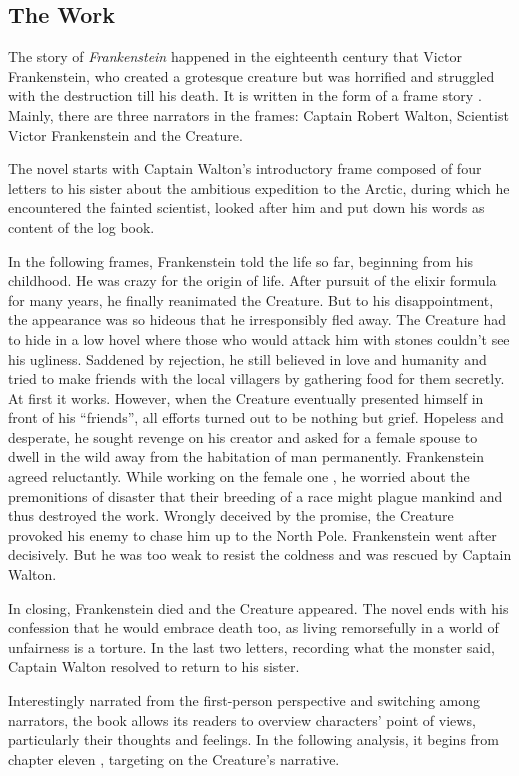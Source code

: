 \subsection{The Work} %
\label{sub:the_work}
\begin{text}

The story of \textit{Frankenstein} happened in the eighteenth century that Victor Frankenstein, who created a grotesque creature but was horrified and struggled with the destruction till his death. It is written in the form of a frame story \citep{wiki:flkst}. Mainly, there are three narrators in the frames: Captain Robert Walton, Scientist Victor Frankenstein and the Creature.

The novel starts with Captain Walton's introductory frame composed of four letters to his sister about the ambitious expedition to the Arctic, during which he encountered the fainted scientist, looked after him and put down his words as content of the log book.

In the following frames, Frankenstein told the life so far, beginning from his childhood. He was crazy for the origin of life. After pursuit of the elixir formula for many years, he finally reanimated the Creature. But to his disappointment, the appearance was so hideous that he irresponsibly fled away. The Creature had to hide in a low hovel where those who would attack him with stones couldn't see his ugliness. Saddened by rejection, he still believed in love and humanity and tried to make friends with the local villagers by gathering food for them secretly. At first it works. However, when the Creature eventually presented himself in front of his ``friends'', all efforts turned out to be nothing but grief. Hopeless and desperate, he sought revenge on his creator and asked for a female spouse to dwell in the wild away from the habitation of man permanently. Frankenstein agreed reluctantly. While working on the female one , he worried about the premonitions of disaster that their breeding of a race might plague mankind and thus destroyed the work. Wrongly deceived by the promise, the Creature provoked his enemy to chase him up to the North Pole. Frankenstein went after decisively. But he was too weak to resist the coldness and was rescued by Captain Walton.

In closing, Frankenstein died and the Creature appeared. The novel ends with his confession that he would embrace death too, as living remorsefully in a world of unfairness is a torture. In the last two letters, recording what the monster said, Captain Walton resolved to return to his sister.

Interestingly narrated from the first-person perspective and switching among narrators, the book allows its readers to overview characters' point of views, particularly their thoughts and feelings. In the following analysis, it begins from chapter eleven , targeting on the Creature's narrative.

\end{text}
\newcommand\citeflkst[2][p]{(\citec{cflksten}{#1. #2})}
